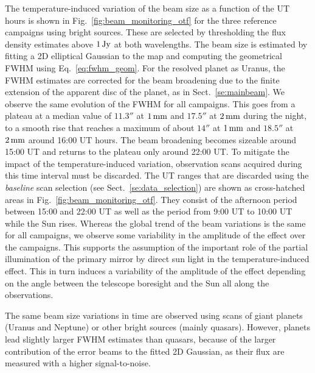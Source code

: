 The temperature-induced variation of the beam size as a function of
the UT hours is shown in Fig.~\ref{fig:beam_monitoring_otf} for the
three reference campaigns using bright sources. These are
selected by thresholding the flux density estimates above $1\,\rm{Jy}$
at both wavelengths. The beam size is estimated by fitting a 2D
elliptical Gaussian to the map {\lp and computing the geometrical FWHM
using Eq.~\ref{eq:fwhm_geom}.} For the resolved planet as Uranus, the
FWHM estimates are corrected for the beam broadening due to the finite
extension of the apparent disc of the planet, as in
Sect.~\ref{se:mainbeam}.
We observe the same evolution of
the FWHM for all campaigns. 
This goes from a plateau at a median value of $11.3''$ at $1\,\rm{mm}$
and $17.5''$ at $2\,\rm{mm}$ during the night, to a smooth rise that
reaches a maximum of about $14''$ at $1\,\rm{mm}$ and $18.5''$ at
$2\,\rm{mm}$ around 16:00 UT
hours. The beam broadening becomes sizeable
around 15:00 UT and returns to the plateau only around 22:00 UT.
To mitigate the impact of the temperature-induced variation,
observation scans acquired during this time interval must be
discarded. The UT ranges that are discarded
using the \emph{baseline} scan selection (see
Sect.~\ref{se:data_selection}) are shown as cross-hatched areas in
Fig.~\ref{fig:beam_monitoring_otf}.
They consist of the afternoon
period between 15:00 and 22:00 UT%
as well as the period from 9:00 UT to 10:00 UT while the Sun
rises. 
{\lp Whereas the global trend of the beam variations is the
same for all campaigns, we observe some variability in the amplitude
of the effect over the campaigns. This supports the assumption of the
important role of the partial illumination of the primary mirror by
direct sun light in the temperature-induced effect. This in turn
induces a variability of the amplitude of the effect depending on the
angle between the telescope boresight and the Sun all along the
observations.}

The same beam size variations in time are observed using scans of giant planets
(Uranus and Neptune) or other bright
sources (mainly quasars). However, planets lead slightly larger FWHM
estimates than quasars, because of
the larger contribution of the error beams to the fitted 2D Gaussian,
as their flux are measured with a higher signal-to-noise.

